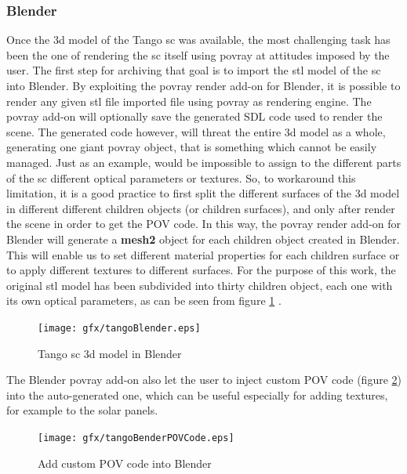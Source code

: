 \subsubsection{Blender}
Once the \acrshort{3d} model of the Tango \acrshort{sc} was available, the most challenging task has been the one of rendering the \acrshort{sc} itself using \acrshort{povray} at attitudes imposed by the user.
The first step for archiving that goal is to import the \acrshort{stl} model of the \acrshort{sc} into Blender. By exploiting the \acrshort{povray} render add-on for Blender, it is possible to render any given \acrshort{stl} file imported file using \acrshort{povray} as rendering engine. The \acrshort{povray} add-on will optionally save the generated SDL code used to render the scene.
The generated code however, will threat the entire \acrshort{3d} model as a whole, generating one giant \acrshort{povray}  object, that is something which cannot be easily managed. Just as an example, would be impossible to assign to the different parts of the \acrshort{sc} different optical parameters or textures.
So, to workaround this limitation, it is a good practice to first split the different surfaces of the \acrshort{3d} model in different different children objects (or children surfaces), and only after render the scene in order to get the POV code. In this way, the \acrshort{povray} render add-on for Blender will generate a \textbf{mesh2} object for each children object created in Blender.
This will enable us to set different material properties for each children surface or to apply different textures to different surfaces.
For the purpose of this work, the original \acrshort{stl} model has been subdivided into thirty children object, each one with its own optical parameters, as can be seen from figure \ref{fig:tangoblender} .

\begin{figure}[htbp]
  \centering
  \texttt{[image: gfx/tangoBlender.eps]}
  \caption{Tango \acrshort{sc} \acrshort{3d} model in Blender}
  \label{fig:tangoblender}
\end{figure}

The Blender \acrshort{povray} add-on also let the user to inject custom POV code (figure \ref{fig:tangoblenderpov}) into the auto-generated one, which can be useful especially for adding textures, for example to the solar panels.

\begin{figure}[htbp]
  \centering
  \texttt{[image: gfx/tangoBenderPOVCode.eps]}
  \caption{Add custom POV code into Blender}
  \label{fig:tangoblenderpov}
\end{figure}

